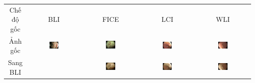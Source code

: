 \documentclass[12pt]{extreport}
\begin{document}
\begin{table}[H]
    \centering
    \begin{tabular}{c | c | c | c | c}
        Chế độ gốc & BLI                                                                  & FICE                                                                  & LCI                                                                  & WLI                                                                  \\
        Ảnh gốc    & \includegraphics[width=0.185\textwidth]{transform/BLI_original.jpeg} & \includegraphics[width=0.185\textwidth]{transform/FICE_original.jpeg} & \includegraphics[width=0.185\textwidth]{transform/LCI_original.jpeg} & \includegraphics[width=0.185\textwidth]{transform/WLI_original.jpeg} \\
        \hline
        Sang BLI   &                                                                      & \includegraphics[width=0.185\textwidth]{transform/FICE2BLI.jpeg}      & \includegraphics[width=0.185\textwidth]{transform/LCI2BLI.jpeg}      & \includegraphics[width=0.185\textwidth]{transform/WLI2BLI.jpeg}      \\

\end{tabular}
\end{table}
\end{document}
